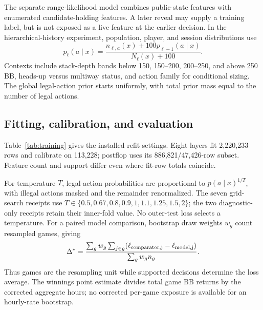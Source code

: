 The separate range-likelihood model combines public-state features with enumerated candidate-holding features. A later reveal may supply a training label, but is not exposed as a live feature at the earlier decision. In the hierarchical-history experiment, population, player, and session distributions use
\begin{equation}
p_{\ell}(a\mid x)=\frac{n_{\ell,a}(x)+100p_{\ell-1}(a\mid x)}{N_{\ell}(x)+100}.
\end{equation}
Contexts include stack-depth bands below 150, 150--200, 200--250, and above 250 BB, heads-up versus multiway status, and action family for conditional sizing. The global legal-action prior starts uniformly, with total prior mass equal to the number of legal actions.

\subsection{Fitting, calibration, and evaluation}
Table~\ref{tab:training} gives the installed refit settings. Eight layers fit 2,220,233 rows and calibrate on 113,228; postflop uses its 886,821/47,426-row subset. Feature count and support differ even where fit-row totals coincide.



For temperature \(T\), legal-action probabilities are proportional to \(p(a\mid x)^{1/T}\), with illegal actions masked and the remainder renormalized. The seven grid-search receipts use \(T\in\{0.5,0.67,0.8,0.9,1,1.1,1.25,1.5,2\}\); the two diagnostic-only receipts retain their inner-fold value. No outer-test loss selects a temperature. For a paired model comparison, bootstrap draw weights \(w_g\) count resampled games, giving
\begin{equation}
\Delta^*=\frac{\sum_g w_g\sum_{j\in g}(\ell_{\rm comparator,j}-\ell_{\rm model,j})}{\sum_g w_g n_g}.
\end{equation}
Thus games are the resampling unit while supported decisions determine the loss average. The winnings point estimate divides total game BB returns by the corrected aggregate hours; no corrected per-game exposure is available for an hourly-rate bootstrap.

